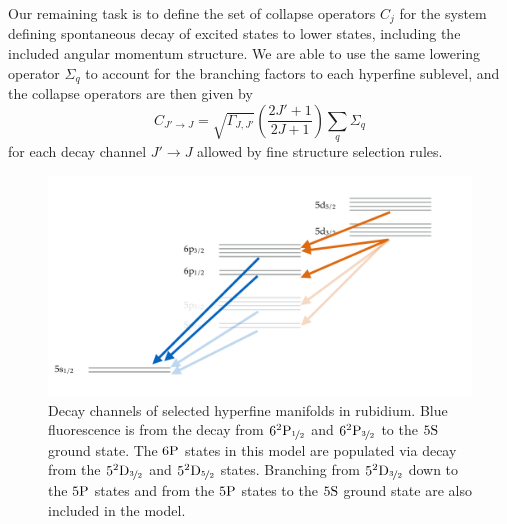     Our remaining task is to define the set of collapse operators $C_j$ for the
    system defining spontaneous decay of excited states to lower states,
    including the included angular momentum structure. We are able to use the
    same lowering operator $\Sigma_q$ to account for the branching factors to
    each hyperfine sublevel, and the collapse operators are then given by
    \begin{equation}
      C_{J' \rightarrow J} = \sqrt{\Gamma_{J,J'}} 
        \left( \frac{2J' + 1}{2J + 1} \right)  \sum_q \Sigma_q
    \end{equation}
    for each decay channel $J' \rightarrow J$ allowed by fine structure
    selection rules.

    \begin{figure}[]
    \includegraphics[width=\linewidth]
        {figs/05_twophoton/twophoton_level_scheme_decay_2.pdf}
    \caption{
    Decay channels of selected hyperfine manifolds in rubidium.  Blue
    fluorescence is from the decay from $6^2\rm{P}_{\nicefrac{1}{2}}$ and
    $6^2\rm{P}_{\nicefrac{3}{2}}$ to the $5\rm{S}$ ground state. The $6\rm{P}$
    states in this model are populated via decay from the
    $5^2\rm{D}_{\nicefrac{3}{2}}$ and $5^2\rm{D}_{\nicefrac{5}{2}}$ states.
    Branching from $5^2\rm{D}_{\nicefrac{3}{2}}$ down to the $5\rm{P}$ states
    and from the $5\rm{P}$ states to the $5\rm{S}$ ground state are also
    included in the model.
    } 
    \label{fig:twophoton_level_scheme_decay} 
    \end{figure}


